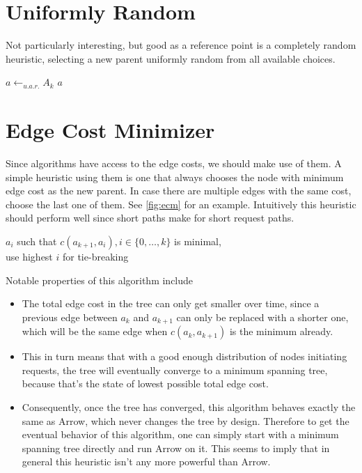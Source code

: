 \documentclass[a4paper, oneside]{discothesis}
\begin{document}
\section{Uniformly Random}

Not particularly interesting, but good as a reference point is a completely random heuristic, selecting a new parent uniformly random from all available choices.

\begin{algorithmic}
\State$a\gets_{u.a.r.}A_k$
\State\Return $a$
\EndFunction
\end{algorithmic}

\section{Edge Cost Minimizer}
\label{alg:ecm}

Since algorithms have access to the edge costs, we should make use of them. A simple heuristic using them is one that always chooses the node with minimum edge cost as the new parent. In case there are multiple edges with the same cost, choose the last one of them. See \autoref{fig:ecm} for an example. Intuitively this heuristic should perform well since short paths make for short request paths.
\begin{algorithmic}
\State\Return$a_i$ such that $c(a_{k+1},a_{i}),i\in\{0,\dots,k\}$ is minimal, \\\qquad use highest $i$ for tie-breaking
\EndFunction
\end{algorithmic}

\newpage
Notable properties of this algorithm include
\begin{itemize}
\item The total edge cost in the tree can only get smaller over time, since a previous edge between $a_k$ and $a_{k+1}$ can only be replaced with a shorter one, which will be the same edge when $c(a_k,a_{k+1})$ is the minimum already.
\item This in turn means that with a good enough distribution of nodes initiating requests, the tree will eventually converge to a minimum spanning tree, because that's the state of lowest possible total edge cost.
\item Consequently, once the tree has converged, this algorithm behaves exactly the same as Arrow, which never changes the tree by design. Therefore to get the eventual behavior of this algorithm, one can simply start with a minimum spanning tree directly and run Arrow on it. This seems to imply that in general this heuristic isn't any more powerful than Arrow.
\end{itemize}
\end{document}
